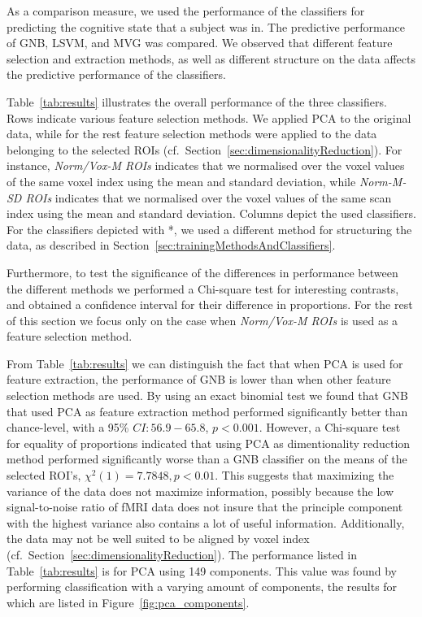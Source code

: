 \documentclass[preprint,journal,11pt]{vgtc}
\begin{document}
As a comparison measure, we used the performance of the classifiers for predicting the cognitive state that a subject was in. The predictive performance of GNB, LSVM, and MVG was compared. We observed that different feature selection and extraction methods, as well as different structure on the data affects the predictive performance of the classifiers.

Table~\ref{tab:results} illustrates the overall performance of the three classifiers. Rows indicate various feature selection methods. We applied PCA to the original data, while for the rest feature selection methods were applied to the data belonging to the selected ROIs (cf.~Section~\ref{sec:dimensionalityReduction}). For instance, \emph{Norm/Vox-M ROIs} indicates that we normalised over the voxel values of the same voxel index using the mean and standard deviation, while \emph{Norm-M-SD ROIs} indicates that we normalised over the voxel values of the same scan index using the mean and standard deviation. Columns depict the used classifiers. For the classifiers depicted with *, we used a different method for structuring the data, as described in Section~\ref{sec:trainingMethodsAndClassifiers}.

Furthermore, to test the significance of the differences in performance between the different methods we performed a Chi-square test for interesting contrasts, and obtained a confidence interval for their difference in proportions. For the rest of this section we focus only on the case when \emph{Norm/Vox-M ROIs} is used as a feature selection method.

From Table~\ref{tab:results} we can distinguish the fact that when PCA is used for feature extraction, the performance of GNB is lower than when other feature selection methods are used. By using an exact binomial test we found that GNB that used PCA as feature extraction method performed significantly better than chance-level, with a 95\% $CI: 56.9 - 65.8$, $p < 0.001$. However, a Chi-square test for equality of proportions indicated that using PCA as dimentionality reduction method performed significantly worse than a GNB classifier on the means of the selected ROI's, $\chi^2(1) = 7.7848, p < 0.01$. This suggests that maximizing the variance of the data does not maximize information, possibly because the low signal-to-noise ratio of fMRI data does not insure that the principle component with the highest variance also contains a lot of useful information. Additionally, the data may not be well suited to be aligned by voxel index (cf.~Section~\ref{sec:dimensionalityReduction}). The performance listed in Table~\ref{tab:results} is for PCA using 149 components. This value was found by performing classification with a varying amount of components, the results for which are listed in Figure~\ref{fig:pca_components}.
\end{document}
